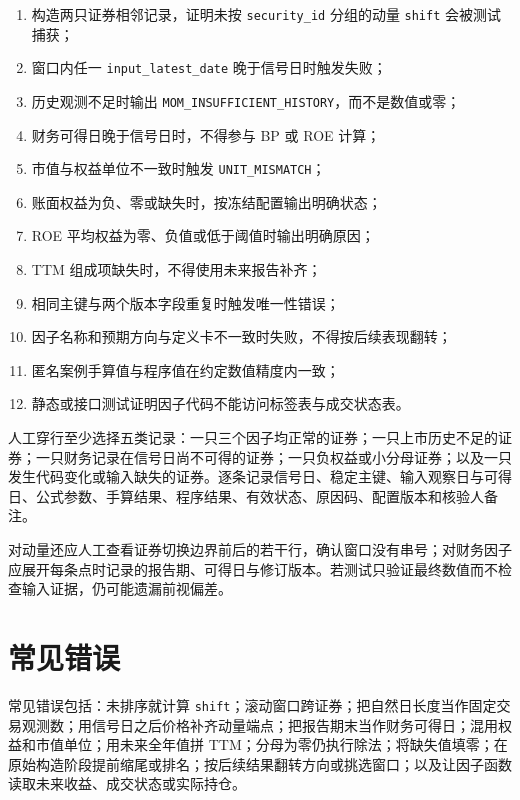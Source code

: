 \begin{enumerate}
  \item 构造两只证券相邻记录，证明未按 \texttt{security\_id} 分组的动量 \texttt{shift} 会被测试捕获；
  \item 窗口内任一 \texttt{input\_latest\_date} 晚于信号日时触发失败；
  \item 历史观测不足时输出 \texttt{MOM\_INSUFFICIENT\_HISTORY}，而不是数值或零；
  \item 财务可得日晚于信号日时，不得参与 BP 或 ROE 计算；
  \item 市值与权益单位不一致时触发 \texttt{UNIT\_MISMATCH}；
  \item 账面权益为负、零或缺失时，按冻结配置输出明确状态；
  \item ROE 平均权益为零、负值或低于阈值时输出明确原因；
  \item TTM 组成项缺失时，不得使用未来报告补齐；
  \item 相同主键与两个版本字段重复时触发唯一性错误；
  \item 因子名称和预期方向与定义卡不一致时失败，不得按后续表现翻转；
  \item 匿名案例手算值与程序值在约定数值精度内一致；
  \item 静态或接口测试证明因子代码不能访问标签表与成交状态表。
\end{enumerate}

\begin{practicebox}
人工穿行至少选择五类记录：一只三个因子均正常的证券；一只上市历史不足的证券；一只财务记录在信号日尚不可得的证券；一只负权益或小分母证券；以及一只发生代码变化或输入缺失的证券。逐条记录信号日、稳定主键、输入观察日与可得日、公式参数、手算结果、程序结果、有效状态、原因码、配置版本和核验人备注。
\end{practicebox}

对动量还应人工查看证券切换边界前后的若干行，确认窗口没有串号；对财务因子应展开每条点时记录的报告期、可得日与修订版本。若测试只验证最终数值而不检查输入证据，仍可能遗漏前视偏差。

\section{常见错误}

\begin{warningbox}
常见错误包括：未排序就计算 \texttt{shift}；滚动窗口跨证券；把自然日长度当作固定交易观测数；用信号日之后价格补齐动量端点；把报告期末当作财务可得日；混用权益和市值单位；用未来全年值拼 TTM；分母为零仍执行除法；将缺失值填零；在原始构造阶段提前缩尾或排名；按后续结果翻转方向或挑选窗口；以及让因子函数读取未来收益、成交状态或实际持仓。
\end{warningbox}

